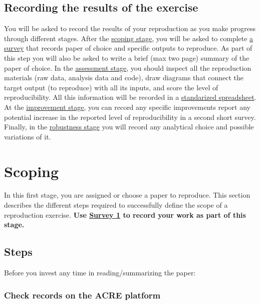 \documentclass[]{book}
\begin{document}
\hypertarget{recording-the-results-of-the-exercise}{%
\section{Recording the results of the exercise}\label{recording-the-results-of-the-exercise}}

You will be asked to record the results of your reproduction as you make progress through different stages. After the \protect\hyperlink{scoping}{scoping stage}, you will be asked to complete \href{https://berkeley.qualtrics.com/jfe/form/SV_8hLHNI6LGSYchEN}{a survey} that records paper of choice and specific outputs to reproduce. As part of this step you will also be asked to write a brief (max two page) summary of the paper of choice. In the \protect\hyperlink{assessment}{assessment stage}, you should inspect all the reproduction materials (raw data, analysis data and code), draw diagrams that connect the target output (to reproduce) with all its inputs, and score the level of reproducibility. All this information will be recorded in a \href{ADD\%20LINK}{standarized spreadsheet}. At the \href{(\#improvements)}{improvement stage}, you can record any specific improvements report any potential increase in the reported level of reproducibility in a second short survey. Finally, in the \protect\hyperlink{robust}{robustness stage} you will record any analytical choice and possible variations of it.

\hypertarget{scoping}{%
\chapter{Scoping}\label{scoping}}

In this first stage, you are assigned or choose a paper to reproduce. This section describes the different steps required to successfully define the scope of a reproduction exercise. \textbf{Use \href{https://berkeley.qualtrics.com/jfe/form/SV_8hLHNI6LGSYchEN}{Survey 1} to record your work as part of this stage.}

\hypertarget{steps}{%
\section{Steps}\label{steps}}

Before you invest any time in reading/summarizing the paper:

\hypertarget{check-acre}{%
\subsection{Check records on the ACRE platform}\label{check-acre}}
\end{document}
